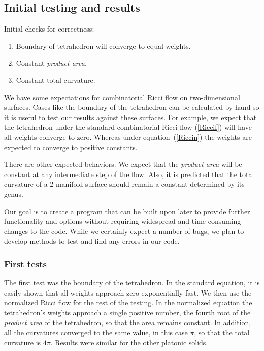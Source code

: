 \documentclass[12pt]{article}
\begin{document}
\subsection{Initial testing and results}

\noindent Initial checks for correctness:
\begin{enumerate}
\item Boundary of tetrahedron will converge to equal weights.
\item Constant \textit{product area}.
\item Constant total curvature.
\end{enumerate}

We have some expectations for combinatorial Ricci flow on two-dimensional surfaces. Cases like the boundary of the tetrahedron can be calculated by hand so it is useful to test our results against these surfaces. For example, we expect that the tetrahedron under the standard combinatorial Ricci flow (\ref{Riccif}) will have all weights converge to zero. Whereas under equation~(\ref{Riccin}) the weights are expected to converge to positive constants.\newline

\noindent There are other expected behaviors. We expect that the \textit{product area} will be constant at any intermediate step of the flow. Also, it is predicted that the total curvature of a 2-manifold surface should remain a constant determined by its genus.\newline

\noindent Our goal is to create a program that can be built upon later to provide further functionality and options without requiring widespread and time consuming changes to the code. While we certainly expect a number of bugs, we plan to develop methods to test and find any errors in our code. \newline

\subsubsection{First tests}
\label{InitialResults}
The first test was the boundary of the tetrahedron. In the standard equation, it is easily shown that all weights approach zero exponentially fast. We then use the normalized Ricci flow for the rest of the testing. In the normalized equation the tetrahedron's weights approach a single positive number, the fourth root of the \textit{product area} of the tetrahedron, so that the area remains constant. In addition, all the curvatures converged to the same value, in this case $\pi$, so that the total curvature is $4\pi$. Results were similar for the other platonic solids.\newline
\end{document}
